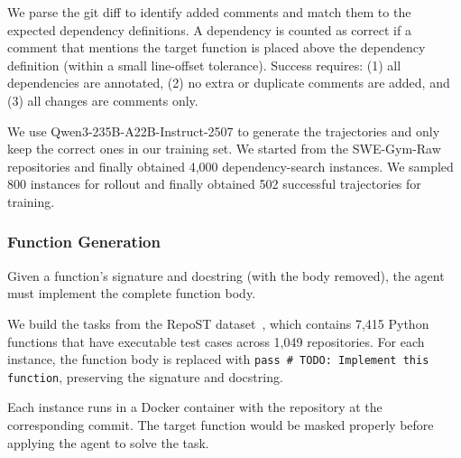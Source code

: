 \documentclass{article}
\theoremstyle{plain}
\theoremstyle{definition}
\theoremstyle{remark}
\begin{document}
We parse the git diff to identify added comments and match them to the expected dependency definitions.
A dependency is counted as correct if a comment that mentions the target function is placed above the dependency definition (within a small line-offset tolerance).
Success requires: (1) all dependencies are annotated, (2) no extra or duplicate comments are added, and (3) all changes are comments only.

We use Qwen3-235B-A22B-Instruct-2507 to generate the trajectories and only keep the correct ones in our training set. We started from the SWE-Gym-Raw repositories and finally obtained 4,000 dependency-search instances.
We sampled 800 instances for rollout and finally obtained 502 successful trajectories for training.


\subsubsection{Function Generation}
Given a function's signature and docstring (with the body removed), the agent must implement the complete function body.

We build the tasks from the RepoST dataset~\citep{repost}, which contains 7,415 Python functions that have executable test cases across 1,049 repositories. For each instance, the function body is replaced with \texttt{pass \# TODO: Implement this function}, preserving the signature and docstring.

Each instance runs in a Docker container with the repository at the corresponding commit. The target function would be masked properly before applying the agent to solve the task.
\end{document}
